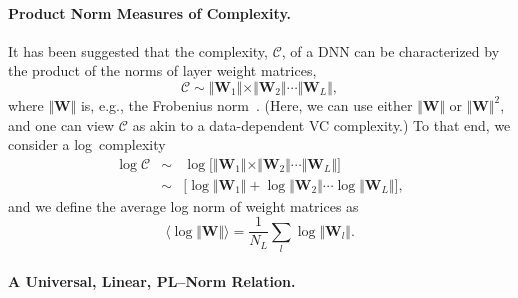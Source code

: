 \paragraph{Product Norm Measures of Complexity.} 


It has been suggested that the complexity, $\mathcal{C}$, of a DNN can be characterized by the product of the norms of layer weight matrices,
$$
\mathcal{C}\sim\Vert\mathbf{W}_{1}\Vert\times\Vert\mathbf{W}_{2}\Vert\cdots\Vert\mathbf{W}_{L}\Vert ,
$$
where $\Vert\mathbf{W}\Vert$ is, e.g., the Frobenius norm~\cite{LMBx18_TR, SHNx17_TR,PLMx18_TR}.
(Here, we can use either $\Vert\mathbf{W}\Vert$ or $\Vert\mathbf{W}\Vert^{2}$, and one can view $\mathcal{C}$ as akin to a data-dependent VC complexity.)
To that end, we consider a log~complexity
\begin{eqnarray*}
\log\mathcal{C} &\sim& \log\bigg[\Vert\mathbf{W}_{1}\Vert\times\Vert\mathbf{W}_{2}\Vert\cdots\Vert\mathbf{W}_{L}\Vert\bigg]  \\
                &\sim& \bigg[\log\Vert\mathbf{W}_{1}\Vert+\log\Vert\mathbf{W}_{2}\Vert\cdots\log\Vert\mathbf{W}_{L}\Vert\bigg]  ,
\end{eqnarray*}
and we define the average log norm of weight matrices as
\begin{equation}
\langle\log\Vert\mathbf{W}\Vert\rangle=\dfrac{1}{N_{L}}\sum_{l}\log\Vert\mathbf{W}_{l}\Vert  .
\label{eqn:av_log_norm}
\end{equation}



\paragraph{A Universal, Linear, PL--Norm Relation.} 

